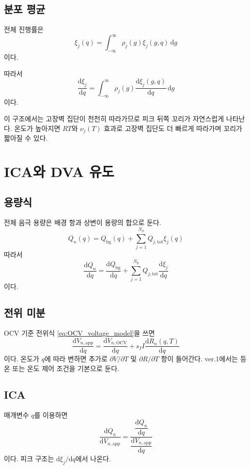 \documentclass[11pt,a4paper]{article}
\newcommand{\dd}{\mathrm{d}}
\newcommand{\OCV}{\mathrm{OCV}}
\newcommand{\app}{\mathrm{app}}
\newcommand{\tot}{\mathrm{tot}}
\newcommand{\bg}{\mathrm{bg}}
\begin{document}
\subsection{분포 평균}
전체 진행률은
\begin{equation}
\boxed{
\xi_j(q)=\int_{-\infty}^{\infty}\rho_j(g)\xi_j(g,q)\,\dd g
}
\label{eq:xi_distribution}
\end{equation}
이다.

따라서
\begin{equation}
\boxed{
\frac{\dd\xi_j}{\dd q}=\int_{-\infty}^{\infty}\rho_j(g)\frac{\dd\xi_j(g,q)}{\dd q}\,\dd g
}
\label{eq:dxi_distribution}
\end{equation}
이다.

이 구조에서는 고장벽 집단이 천천히 따라가므로 피크 뒤쪽 꼬리가 자연스럽게 나타난다. 온도가 높아지면 \(RT\)와 \(\nu_j(T)\) 효과로 고장벽 집단도 더 빠르게 따라가며 꼬리가 짧아질 수 있다.

\section{ICA와 DVA 유도}
\subsection{용량식}
전체 음극 용량은 배경 항과 상변이 용량의 합으로 둔다.
\begin{equation}
Q_n(q)=Q_{\bg}(q)+\sum_{j=1}^{N_p}Q_{j,\tot}\xi_j(q)
\label{eq:Qn}
\end{equation}
따라서
\begin{equation}
\frac{\dd Q_n}{\dd q}=\frac{\dd Q_{\bg}}{\dd q}+\sum_{j=1}^{N_p}Q_{j,\tot}\frac{\dd\xi_j}{\dd q}
\label{eq:dQdq}
\end{equation}
이다.

\subsection{전위 미분}
OCV 기준 전위식 \eqref{eq:OCV_voltage_model}을 쓰면
\begin{equation}
\frac{\dd V_{n,\app}}{\dd q}=\frac{\dd V_{n,\OCV}}{\dd q}+s_II\frac{\dd R_n(q,T)}{\dd q}
\label{eq:dVdq}
\end{equation}
이다. 온도가 \(q\)에 따라 변하면 추가로 \(\partial V/\partial T\) 및 \(\partial R/\partial T\) 항이 들어간다. ver.1에서는 등온 또는 온도 제어 조건을 기본으로 둔다.

\subsection{ICA}
매개변수 \(q\)를 이용하면
\begin{equation}
\boxed{
\frac{\dd Q_n}{\dd V_{n,\app}}=\frac{\dfrac{\dd Q_n}{\dd q}}{\dfrac{\dd V_{n,\app}}{\dd q}}
}
\label{eq:ICA_param}
\end{equation}
이다. 피크 구조는 \(\dd\xi_j/\dd q\)에서 나온다.
\end{document}
